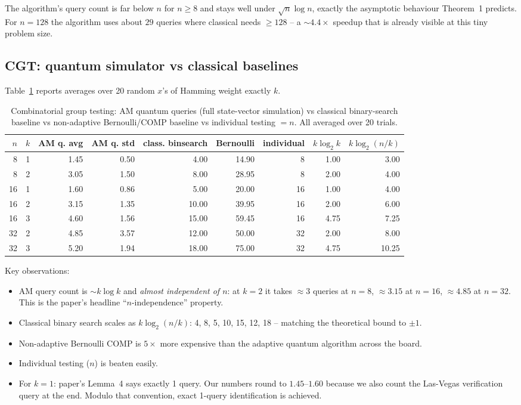 \documentclass[11pt]{article}
\begin{document}
The algorithm's query count is far below $n$ for $n\ge 8$ and stays well
under $\sqrt n\log n$, exactly the asymptotic behaviour Theorem~1 predicts.
For $n=128$ the algorithm uses about $29$ queries where classical needs
$\ge 128$ -- a $\sim 4.4\times$ speedup that is already visible at this
tiny problem size.

\subsection{CGT: quantum simulator vs classical baselines}

Table~\ref{tab:cgt} reports averages over 20 random $x$'s of Hamming
weight exactly $k$.

\begin{table}[h]\centering
\caption{Combinatorial group testing: AM quantum queries (full state-vector
simulation) vs classical binary-search baseline vs non-adaptive Bernoulli/COMP
baseline vs individual testing $= n$. All averaged over 20 trials.}
\label{tab:cgt}
\small
\begin{tabular}{@{}rrrrrrrrr@{}}
\toprule
$n$ & $k$ & AM q. avg & AM q. std & class. binsearch & Bernoulli & individual & $k\log_2 k$ & $k\log_2(n/k)$ \\
\midrule
 8 & 1 &  1.45 & 0.50 &  4.00 &  14.90 &  8 & 1.00 & 3.00 \\
 8 & 2 &  3.05 & 1.50 &  8.00 &  28.95 &  8 & 2.00 & 4.00 \\
16 & 1 &  1.60 & 0.86 &  5.00 &  20.00 & 16 & 1.00 & 4.00 \\
16 & 2 &  3.15 & 1.35 & 10.00 &  39.95 & 16 & 2.00 & 6.00 \\
16 & 3 &  4.60 & 1.56 & 15.00 &  59.45 & 16 & 4.75 & 7.25 \\
32 & 2 &  4.85 & 3.57 & 12.00 &  50.00 & 32 & 2.00 & 8.00 \\
32 & 3 &  5.20 & 1.94 & 18.00 &  75.00 & 32 & 4.75 &10.25 \\
\bottomrule
\end{tabular}
\end{table}

Key observations:
\begin{itemize}
  \item AM query count is $\sim k\log k$ and \emph{almost independent of
  $n$}: at $k=2$ it takes $\approx 3$ queries at $n=8$, $\approx 3.15$
  at $n=16$, $\approx 4.85$ at $n=32$. This is the paper's headline
  ``$n$-independence'' property.
  \item Classical binary search scales as $k\log_2(n/k)$: 4, 8, 5, 10, 15,
  12, 18 -- matching the theoretical bound to $\pm 1$.
  \item Non-adaptive Bernoulli COMP is $5\times$ more expensive than the
  adaptive quantum algorithm across the board.
  \item Individual testing ($n$) is beaten easily.
  \item For $k=1$: paper's Lemma~4 says exactly 1 query. Our numbers
  round to $1.45$--$1.60$ because we also count the Las-Vegas
  verification query at the end. Modulo that convention, exact 1-query
  identification is achieved.
\end{itemize}
\end{document}
